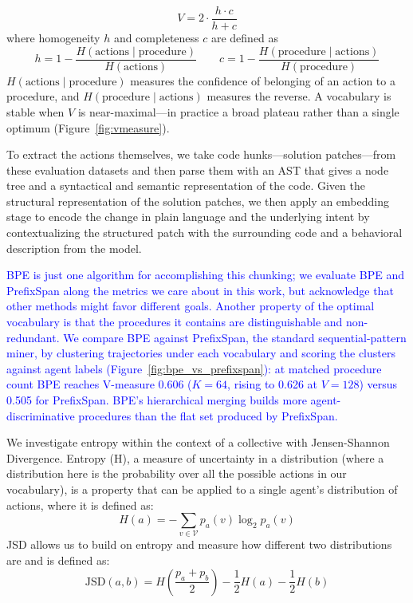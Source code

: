 \documentclass[12pt]{article}
\begin{document}
\[ V = 2 \cdot \frac{h \cdot c}{h + c} \]
where homogeneity $h$ and completeness $c$ are defined as
\[ h = 1 - \frac{H(\text{actions} \mid \text{procedure})}{H(\text{actions})} \qquad c = 1 - \frac{H(\text{procedure} \mid \text{actions})}{H(\text{procedure})} \]
$H(\text{actions} \mid \text{procedure})$ measures the confidence of belonging of an action to a procedure, and $H(\text{procedure} \mid \text{actions})$ measures the reverse. A vocabulary is stable when $V$ is near-maximal---in practice a broad plateau rather than a single optimum (Figure~\ref{fig:vmeasure}).

To extract the actions themselves, we take code hunks---solution patches---from these evaluation datasets and then parse them with an AST that gives a node tree and a syntactical and semantic representation of the code. Given the structural representation of the solution patches, we then apply an embedding stage to encode the change in plain language and the underlying intent by contextualizing the structured patch with the surrounding code and a behavioral description from the model.

\textcolor{blue}{BPE is just one algorithm for accomplishing this chunking; we evaluate BPE and PrefixSpan along the metrics we care about in this work, but acknowledge that other methods might favor different goals. Another property of the optimal vocabulary is that the procedures it contains are distinguishable and non-redundant. We compare BPE against PrefixSpan, the standard sequential-pattern miner, by clustering trajectories under each vocabulary and scoring the clusters against agent labels (Figure~\ref{fig:bpe_vs_prefixspan}): at matched procedure count BPE reaches V-measure 0.606 ($K=64$, rising to 0.626 at $V=128$) versus 0.505 for PrefixSpan. BPE's hierarchical merging builds more agent-discriminative procedures than the flat set produced by PrefixSpan.}

We investigate entropy within the context of a collective with Jensen-Shannon Divergence. Entropy (H), a measure of uncertainty in a distribution (where a distribution here is the probability over all the possible actions in our vocabulary), is a property that can be applied to a single agent's distribution of actions, where it is defined as: $$H(a) = -\sum_{v \in \mathcal{V}} p_a(v) \log_2 p_a(v)$$ JSD allows us to build on entropy and measure how different two distributions are and is defined as: $$\mathrm{JSD}(a, b) = H\!\left(\frac{p_a + p_b}{2}\right) - \frac{1}{2}H(a) - \frac{1}{2}H(b)$$
\end{document}
